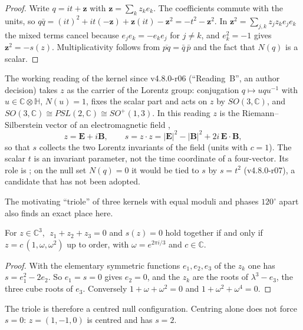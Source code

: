\begin{proof}
Write $q=it+\mathbf z$ with $\mathbf z=\sum_kz_ke_k$. The coefficients commute with the units, so
$q\bar q=(it)^2+it(-\mathbf z)+\mathbf z(it)-\mathbf z^2=-t^2-\mathbf z^2$. In
$\mathbf z^2=\sum_{j,k}z_jz_ke_je_k$ the mixed terms cancel because $e_je_k=-e_ke_j$ for $j\neq k$, and
$e_k^2=-1$ gives $\mathbf z^2=-s(z)$. Multiplicativity follows from $\overline{pq}=\bar q\,\bar p$ and
the fact that $N(q)$ is a scalar.
\end{proof}

The working reading of the kernel since v4.8.0-r06 (``Reading~B'', an author decision) takes $z$ as
the carrier of the Lorentz group: conjugation $q\mapsto uqu^{-1}$ with $u\in\mathbb C\otimes\mathbb H$,
$N(u)=1$, fixes the scalar part and acts on $z$ by $SO(3,\mathbb C)$, and
$SO(3,\mathbb C)\cong PSL(2,\mathbb C)\cong SO^+(1,3)$. In this reading $z$ is the
Riemann--Silberstein vector of an electromagnetic field \cite{A-BBB2013},
\begin{equation}
z=\mathbf E+i\mathbf B,\qquad
s=z\cdot z=|\mathbf E|^2-|\mathbf B|^2+2i\,\mathbf E\cdot\mathbf B ,
\label{eq:A-s}
\end{equation}
so that $s$ collects the two Lorentz invariants of the field (units with $c=1$). The scalar $t$ is
an invariant parameter, not the time coordinate of a four-vector. Its role is \Open; on the null set
$N(q)=0$ it would be tied to $s$ by $s=t^2$ (v4.8.0-r07), a candidate that has not been adopted.

The motivating ``triole'' of three kernels with equal moduli and phases $120^\circ$ apart also
finds an exact place here.

\begin{proposition}[Triole; v4.8.0-r06.2]
\label{prop:A-triole}
For $z\in\mathbb C^3$, $\;z_1+z_2+z_3=0$ and $s(z)=0$ hold together if and only if
$z=c\,(1,\omega,\omega^2)$ up to order, with $\omega=e^{2\pi i/3}$ and $c\in\mathbb C$.
\end{proposition}

\begin{proof}
With the elementary symmetric functions $e_1,e_2,e_3$ of the $z_k$ one has $s=e_1^2-2e_2$. So
$e_1=s=0$ gives $e_2=0$, and the $z_k$ are the roots of $\lambda^3-e_3$, the three cube roots of $e_3$.
Conversely $1+\omega+\omega^2=0$ and $1+\omega^2+\omega^4=0$.
\end{proof}

The triole is therefore a centred null configuration. Centring alone does not force $s=0$:
$z=(1,-1,0)$ is centred and has $s=2$.

